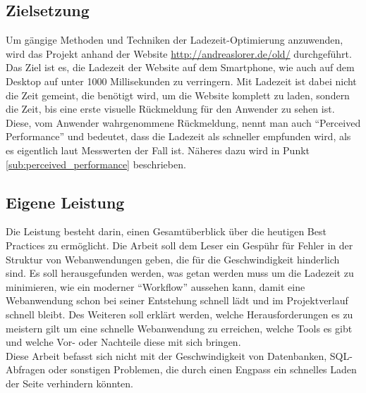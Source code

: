 


	\subsection{Zielsetzung} %
	\label{sub:zielsetzung}
		Um gängige Methoden und Techniken der Ladezeit-Optimierung anzuwenden, wird das Projekt anhand der Website \url{http://andreaslorer.de/old/} durchgeführt. Das Ziel ist es, die Ladezeit der Website auf dem Smartphone, wie auch auf dem Desktop auf unter 1000 Millisekunden zu verringern. Mit Ladezeit ist dabei nicht die Zeit gemeint, die benötigt wird, um die Website komplett zu laden, sondern die Zeit, bis eine erste visuelle Rückmeldung für den Anwender zu sehen ist. Diese, vom Anwender wahrgenommene Rückmeldung, nennt man auch "`Perceived Performance"' und bedeutet, dass die Ladezeit als schneller empfunden wird, als es eigentlich laut Messwerten der Fall ist. Näheres dazu wird in Punkt \ref{sub:perceived_performance} beschrieben.\\




	\subsection{Eigene Leistung} %
	\label{sub:eigene_leistung}
		Die Leistung besteht darin, einen Gesamtüberblick über die heutigen Best Practices zu ermöglicht. Die Arbeit soll dem Leser ein Gespühr für Fehler in der Struktur von Webanwendungen geben, die für die Geschwindigkeit hinderlich sind.
		Es soll herausgefunden werden, was getan werden muss um die Ladezeit zu minimieren, wie ein moderner "`Workflow"' aussehen kann, damit eine Webanwendung schon bei seiner Entstehung schnell lädt und im Projektverlauf schnell bleibt. Des Weiteren soll erklärt werden, welche Herausforderungen es zu meistern gilt um eine schnelle Webanwendung zu erreichen, welche Tools es gibt und welche Vor- oder Nachteile diese mit sich bringen.\\
		Diese Arbeit befasst sich nicht mit der Geschwindigkeit von Datenbanken, SQL-Abfragen oder sonstigen Problemen, die durch einen Engpass ein schnelles Laden der Seite verhindern könnten.




